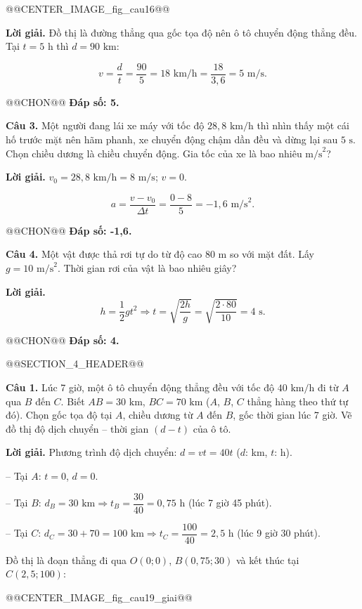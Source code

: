 \documentclass{article}
\begin{document}
@@CENTER_IMAGE_fig_cau16@@

\textbf{Lời giải.} Đồ thị là đường thẳng qua gốc tọa độ nên ô tô chuyển động thẳng đều. Tại $t = 5\text{ h}$ thì $d = 90\text{ km}$:

\[v = \frac{d}{t} = \frac{90}{5} = 18\text{ km/h} = \frac{18}{3{,}6} = 5\text{ m/s}.\]

@@CHON@@ \textbf{Đáp số: 5.}

\textbf{Câu 3.} Một người đang lái xe máy với tốc độ $28{,}8\text{ km/h}$ thì nhìn thấy một cái hố trước mặt nên hãm phanh, xe chuyển động chậm dần đều và dừng lại sau $5\text{ s}$. Chọn chiều dương là chiều chuyển động. Gia tốc của xe là bao nhiêu $\text{m/s}^2$?

\textbf{Lời giải.} $v_0 = 28{,}8\text{ km/h} = 8\text{ m/s}$; $v = 0$.

\[a = \frac{v - v_0}{\Delta t} = \frac{0 - 8}{5} = -1{,}6\text{ m/s}^2.\]

@@CHON@@ \textbf{Đáp số: -1,6.}

\textbf{Câu 4.} Một vật được thả rơi tự do từ độ cao $80\text{ m}$ so với mặt đất. Lấy $g = 10\text{ m/s}^2$. Thời gian rơi của vật là bao nhiêu giây?

\textbf{Lời giải.} \[h = \frac{1}{2}gt^2 \Rightarrow t = \sqrt{\frac{2h}{g}} = \sqrt{\frac{2 \cdot 80}{10}} = 4\text{ s}.\]

@@CHON@@ \textbf{Đáp số: 4.}

@@SECTION_4_HEADER@@

\textbf{Câu 1.} Lúc 7 giờ, một ô tô chuyển động thẳng đều với tốc độ $40\text{ km/h}$ đi từ $A$ qua $B$ đến $C$. Biết $AB = 30\text{ km}$, $BC = 70\text{ km}$ ($A$, $B$, $C$ thẳng hàng theo thứ tự đó). Chọn gốc tọa độ tại $A$, chiều dương từ $A$ đến $B$, gốc thời gian lúc 7 giờ. Vẽ đồ thị độ dịch chuyển -- thời gian $(d - t)$ của ô tô.

\textbf{Lời giải.} Phương trình độ dịch chuyển: $d = vt = 40t$ ($d$: km, $t$: h).

-- Tại $A$: $t = 0$, $d = 0$.

-- Tại $B$: $d_B = 30\text{ km} \Rightarrow t_B = \dfrac{30}{40} = 0{,}75\text{ h}$ (lúc 7 giờ 45 phút).

-- Tại $C$: $d_C = 30 + 70 = 100\text{ km} \Rightarrow t_C = \dfrac{100}{40} = 2{,}5\text{ h}$ (lúc 9 giờ 30 phút).

Đồ thị là đoạn thẳng đi qua $O(0; 0)$, $B(0{,}75; 30)$ và kết thúc tại $C(2{,}5; 100)$:

@@CENTER_IMAGE_fig_cau19_giai@@
\end{document}
